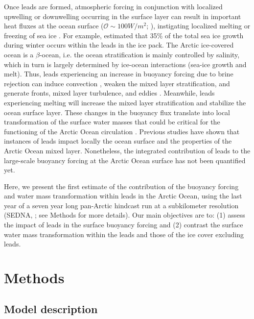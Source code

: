 \documentclass[lineno,sn-basic]{sn-jnl}%
\begin{document}
Once leads are formed, atmospheric forcing in conjunction with localized upwelling or downwelling occurring in the surface layer can result in important heat fluxes at the ocean surface ($\mathcal{O} \sim 100 W/m^2$; \citealp{Bourgault_flux_lkf_2020,Marcq_flux_lead_2012,McPhee_LKF_2005,Maykut_heat_1986}), instigating localized melting or freezing of sea ice \citep{Albedyll_thickness_dis_2022}. For example, \citet{Boutin_rheology_2023} estimated that 35\% of the total sea ice growth during winter occurs within the leads in the ice pack. The Arctic ice-covered ocean is a $\beta$-ocean, i.e. the ocean stratification is mainly controlled by salinity, which in turn is largely determined by ice-ocean interactions (sea-ice growth and melt). Thus, leads experiencing an increase in buoyancy forcing due to brine rejection can induce convection \citep{Smith_convection_1998}, weaken the mixed layer stratification, and generate fronts, mixed layer turbulence, and eddies \citep{Reiser_LKF_2020, Smith_generation_2002}. Meanwhile, leads experiencing melting will increase the mixed layer stratification and stabilize the ocean surface layer. These changes in the buoyancy flux translate into local transformation of the surface water masses that could be critical for the functioning of the Arctic Ocean circulation \citep{Lenn_mixing_2022, Pemberton_WMT_2015, Smith_polynyas_1990}. 
Previous studies have shown that instances of leads impact locally the ocean surface and the properties of the Arctic Ocean mixed layer. Nonetheless, the integrated contribution of leads to the large-scale buoyancy forcing at the Arctic Ocean surface has not been quantified yet.

Here, we present the first estimate of the contribution of the buoyancy forcing and water mass transformation within leads in the Arctic Ocean, using the last year of a seven year long pan-Arctic hindcast run at a subkilometer resolution (SEDNA, \citealp{SEDNA_2023}; see Methods for more details). Our main objectives are to: (1) assess the impact of leads in the surface buoyancy forcing and (2) contrast the surface water mass transformation within the leads and those of the ice cover excluding leads.

\section{Methods}
\subsection*{Model description}
\end{document}

